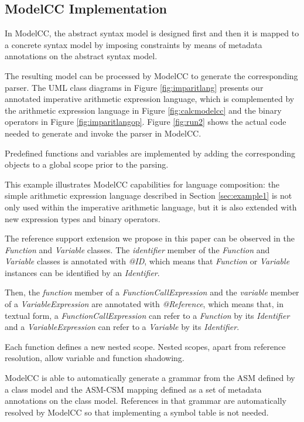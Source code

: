 \documentclass[preprint]{elsarticle}
\begin{document}
\subsection{ModelCC Implementation}

In ModelCC, the abstract syntax model is designed first and then it is mapped to a concrete syntax model by imposing constraints by means of metadata annotations on the abstract syntax model.

The resulting model can be processed by ModelCC to generate the corresponding parser.
The UML class diagrams in Figure \ref{fig:imparitlang} presents our annotated imperative arithmetic expression language, which is complemented by the arithmetic expression language in Figure \ref{fig:calcmodelcc} and the binary operators in Figure \ref{fig:imparitlangop}.
Figure \ref{fig:run2} shows the actual code needed to generate and invoke the parser in ModelCC.

Predefined functions and variables are implemented by adding the corresponding objects to a global scope prior to the parsing.

This example illustrates ModelCC capabilities for language composition: the simple arithmetic expression language described in Section \ref{sec:example1} is not only used within the imperative arithmetic language, but it is also extended with new expression types and binary operators.

The reference support extension we propose in this paper can be observed in the \emph{Function} and \emph{Variable} classes.
The \emph{identifier} member of the \emph{Function} and \emph{Variable} classes is annotated with \emph{@ID}, which means that \emph{Function} or \emph{Variable} instances can be identified by an \emph{Identifier}.

Then, the \emph{function} member of a \emph{FunctionCallExpression} and the \emph{variable} member of a \emph{VariableExpression} are annotated with \emph{@Reference}, which means that, in textual form, a \emph{FunctionCallExpression} can refer to a \emph{Function} by its \emph{Identifier} and a \emph{VariableExpression} can refer to a \emph{Variable} by its \emph{Identifier}.

Each function defines a new nested scope.
Nested scopes, apart from reference resolution, allow variable and function shadowing.

ModelCC is able to automatically generate a grammar from the ASM defined by a class model and the ASM-CSM mapping defined as a set of metadata annotations on the class model.
References in that grammar are automatically resolved by ModelCC so that implementing a symbol table is not needed.
\end{document}
